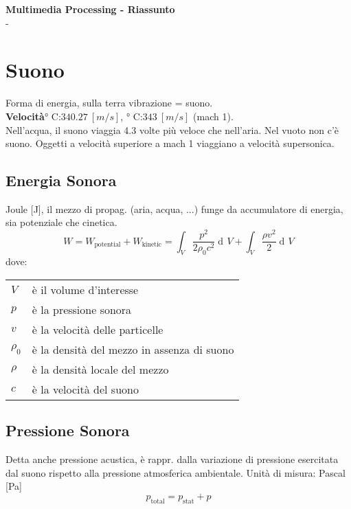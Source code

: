 \documentclass[8pt,a4paper]{article}
\DeclareMathOperator{\di}{d\!}
\begin{document}
\begin{multicols}{5}
  \noindent
  \textbf{Multimedia Processing - Riassunto} \\
  \gitAbbrevHash - \gitAuthorIsoDate \\

    \section{Suono}
    Forma di energia, sulla terra vibrazione = suono. \\
    \textbf{Velocità}° C:\quad $340.27\ [m/s]$,
    ° C:\quad $343\ [m/s]$ (mach 1). \\
    Nell'acqua, il suono viaggia 4.3 volte più veloce che nell'aria.
    Nel vuoto non c'è suono. Oggetti a velocità superiore a mach 1 viaggiano a
    velocità supersonica. \\
    \subsection{Energia Sonora}
    Joule [J], il mezzo di propag. (aria, acqua, ...) funge da accumulatore
    di energia, sia potenziale che cinetica.
    \begin{equation*}
      W = W_{\text{potential}} + W_{\text{kinetic}} = \int_V \frac{p^2}{2\rho_0c^2} \di V
      + \int_V \frac{\rho v^2}{2} \di V
    \end{equation*}
    dove:\\
    \begin{tabular}{l l}
      $V$ & è il volume d'interesse\\
      $p$ & è la pressione sonora\\
      $v$ & è la velocità delle particelle\\
      $\rho_0$ & è la densità del mezzo in assenza di suono\\
      $\rho$ & è la densità locale del mezzo\\
      $c$ & è la velocità del suono
    \end{tabular}
    \subsection{Pressione Sonora}
    Detta anche pressione acustica, è rappr. dalla variazione di pressione esercitata
    dal suono rispetto alla pressione atmosferica ambientale.
    Unità di misura: Pascal [Pa]
    \begin{equation*}
      p_{\text{total}} = p_{\text{stat}} + p 
    \end{equation*}


\end{multicols}
\end{document}
